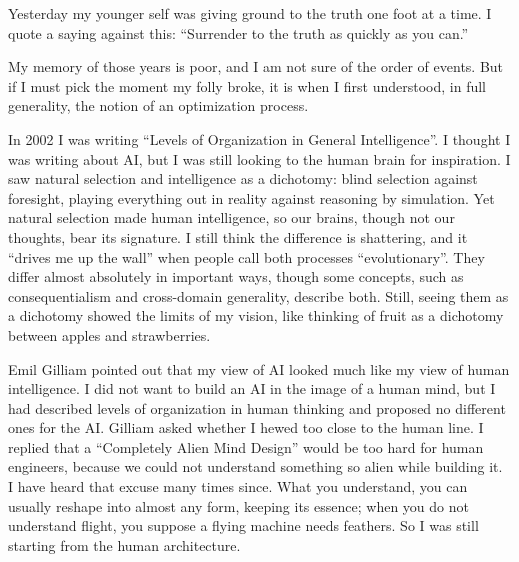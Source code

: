 
Yesterday my younger self was giving ground to the truth one foot at a time. I quote a saying against this: ``Surrender to the truth as quickly as you can.'' 

My memory of those years is poor, and I am not sure of the order of events. But if I must pick the moment my folly broke, it is when I first understood, in full generality, the notion of an optimization process. 

In 2002 I was writing ``Levels of Organization in General Intelligence''. I thought I was writing about AI, but I was still looking to the human brain for inspiration. I saw natural selection and intelligence as a dichotomy: blind selection against foresight, playing everything out in reality against reasoning by simulation. Yet natural selection made human intelligence, so our brains, though not our thoughts, bear its signature.  I still think the difference is shattering, and it ``drives me up the wall'' when people call both processes ``evolutionary''. They differ almost absolutely in important ways, though some concepts, such as consequentialism and cross-domain generality, describe both. Still, seeing them as a dichotomy showed the limits of my vision, like thinking of fruit as a dichotomy between apples and strawberries. 

Emil Gilliam pointed out that my view of AI looked much like my view of human intelligence. I did not want to build an AI in the image of a human mind, but I had described levels of organization in human thinking and proposed no different ones for the AI. Gilliam asked whether I hewed too close to the human line. I replied that a ``Completely Alien Mind Design'' would be too hard for human engineers, because we could not understand something so alien while building it. I have heard that excuse many times since. What you understand, you can usually reshape into almost any form, keeping its essence; when you do not understand flight, you suppose a flying machine needs feathers. So I was still starting from the human architecture.

